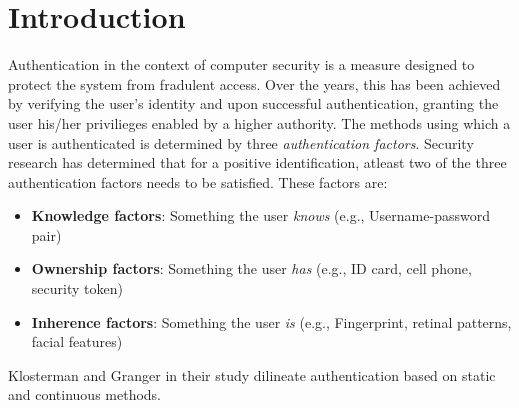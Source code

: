 \documentclass[%
        submission,
        notitlepage,
        narroweqnarray,
        inline,
        ]{ieee}
\begin{document}
\section{Introduction}
\PARstart
Authentication in the context of computer security is a measure designed to protect the system from fradulent access.
Over the years, this has been achieved by verifying the user's identity and upon successful authentication, granting the user his/her privilieges enabled by a higher authority.
The methods using which a user is authenticated is determined by three \emph{authentication factors}.
Security research has determined that for a positive identification, atleast two of the three authentication factors needs to be satisfied.
These factors are:
\begin{itemize}
	\item {\bf Knowledge factors}: Something the user \emph{knows} (e.g., Username-password pair)
	\item {\bf Ownership factors}: Something the user \emph{has} (e.g., ID card, cell phone, security token)
	\item {\bf Inherence factors}: Something the user \emph{is} (e.g., Fingerprint, retinal patterns, facial features)
\end{itemize}
Klosterman and Granger in their study\cite{Klos00} dilineate authentication based on static and continuous methods.
\end{document}
